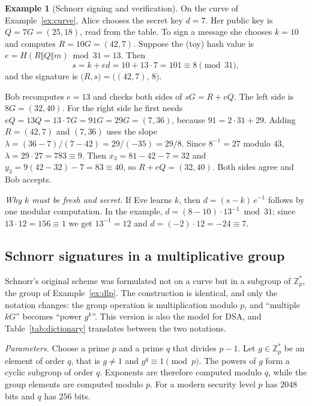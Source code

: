 \documentclass[11pt,a4paper]{article}
\theoremstyle{definition}
\newtheorem{example}[definition]{Example}
\newcommand{\Z}{\mathbb{Z}}
\newcommand{\Hash}{H}
\begin{document}
\begin{example}[Schnorr signing and verification]\label{ex:schnorr}
On the curve of Example~\ref{ex:curve}, Alice chooses the secret key $d=7$. Her public key is $Q=7G=(25,18)$, read from the table. To sign a message she chooses $k=10$ and computes $R=10G=(42,7)$. Suppose the (toy) hash value is $e=\Hash(R\Vert Q\Vert m) \bmod 31=13$. Then
\[
s=k+ed=10+13\cdot 7=101\equiv 8 \pmod{31},
\]
and the signature is $\big(R,s\big)=\big((42,7),\,8\big)$.

Bob recomputes $e=13$ and checks both sides of $sG=R+eQ$. The left side is $8G=(32,40)$. For the right side he first needs $eQ=13Q=13\cdot 7G=91G=29G=(7,36)$, because $91=2\cdot 31+29$. Adding $R=(42,7)$ and $(7,36)$ uses the slope $\lambda=(36-7)/(7-42)=29/(-35)=29/8$. Since $8^{-1}=27$ modulo $43$, $\lambda=29\cdot 27=783\equiv 9$. Then $x_3=81-42-7=32$ and $y_3=9(42-32)-7=83\equiv 40$, so $R+eQ=(32,40)$. Both sides agree and Bob accepts.
\end{example}

\emph{Why $k$ must be fresh and secret.} If Eve learns $k$, then $d=(s-k)\,e^{-1}$ follows by one modular computation. In the example, $d=(8-10)\cdot 13^{-1} \bmod 31$; since $13\cdot 12=156\equiv 1$ we get $13^{-1}=12$ and $d=(-2)\cdot 12=-24\equiv 7$.

\subsection{Schnorr signatures in a multiplicative group}

Schnorr's original scheme was formulated not on a curve but in a subgroup of $\Z_p^*$, the group of Example~\ref{ex:dlp}. The construction is identical, and only the notation changes: the group operation is multiplication modulo $p$, and ``multiple $kG$'' becomes ``power $g^k$''. This version is also the model for DSA, and Table~\ref{tab:dictionary} translates between the two notations.

\emph{Parameters.} Choose a prime $p$ and a prime $q$ that divides $p-1$. Let $g\in\Z_p^*$ be an element of order $q$, that is $g\ne 1$ and $g^q\equiv 1 \pmod p$. The powers of $g$ form a cyclic subgroup of order $q$. Exponents are therefore computed modulo $q$, while the group elements are computed modulo $p$. For a modern security level $p$ has $2048$ bits and $q$ has $256$ bits.
\end{document}
